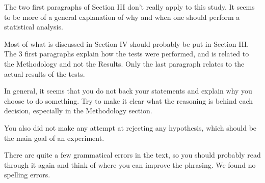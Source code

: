 \documentclass[times, 10pt,twocolumn]{article}
\begin{document}
​​The two first paragraphs of Section III don't really apply to this study. It seems to be more of a general explanation of why and when one should perform a statistical analysis. 

Most of what is discussed in Section IV should probably be put in Section III. The 3 first paragraphs explain how the tests were performed, and is related to the Methodology and not the Results. Only the last paragraph relates to the actual results of the tests. 

In general, it seems that you do not back your statements and explain why you choose to do something. Try to make it clear what the reasoning is behind each decision, especially in the Methodology section. 

You also did not make any attempt at rejecting any hypothesis, which should be the main goal of an experiment. 

There are quite a few grammatical errors in the text, so you should probably read through it again and think of where you can improve the phrasing. We found no spelling errors. 
\end{document}
